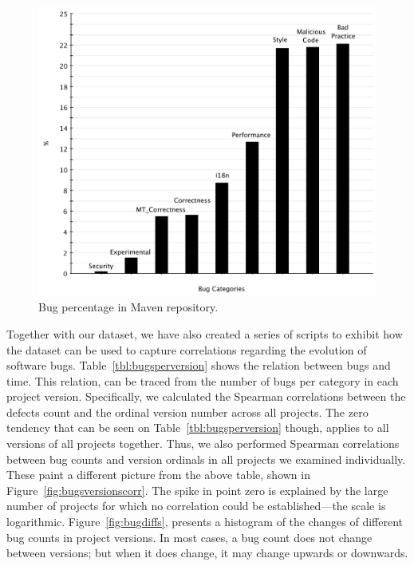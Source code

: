 \documentclass{sig-alternate}
\begin{document}
\begin{figure}[t]
	\centering
	\includegraphics[scale=0.32]{figures/bug_percent}
	\caption{Bug percentage in Maven repository.}
	\label{fig:bug-per} 
\end{figure}


Together with our dataset, we have also created a series of
scripts to exhibit how the dataset can be used
to capture correlations regarding
the evolution of software bugs.
Table~\ref{tbl:bugsperversion} shows the relation between
bugs and time. This relation, can be traced from the number of
bugs per category in each project version. Specifically, we
calculated the Spearman correlations between the defects
count and the ordinal version number across all projects.
The zero tendency that can be seen on Table~\ref{tbl:bugsperversion}
though, applies to all versions of all projects together.
Thus, we also performed Spearman correlations between bug counts and version
ordinals in all projects we examined individually. These paint a different picture
from the above table, shown in Figure~\ref{fig:bugsversionscorr}. The
spike in point zero is explained by the large number of projects for
which no correlation could be established---the scale is
logarithmic.
Figure~\ref{fig:bugdiffs}, presents a histogram of the changes
of different bug counts in
project versions. In most cases, a bug count does not change between
versions; but when it does change, it may change upwards or downwards.
\end{document}
